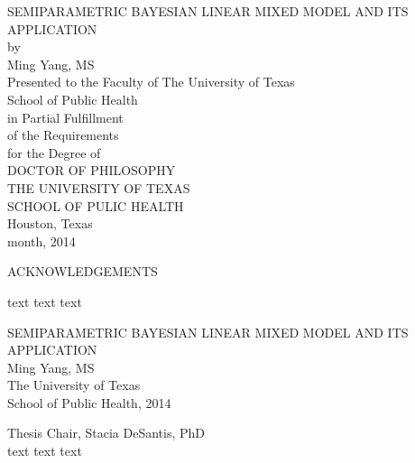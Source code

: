 \documentclass[12pt]{article}
\begin{document}
\newpage
\thispagestyle{empty}
\doublespacing
\begin{center}
{\normalsize SEMIPARAMETRIC BAYESIAN LINEAR MIXED MODEL AND ITS APPLICATION}\\[3.2cm]

by\\[0.5cm]

Ming Yang, MS\\[3.2cm]

Presented to the Faculty of The University of Texas\\
School of Public Health\\
in Partial Fulfillment\\
of the Requirements\\
for the Degree of\\[1.5cm]
DOCTOR OF PHILOSOPHY\\[1.5cm]
\singlespacing
THE UNIVERSITY OF TEXAS\\
SCHOOL OF PULIC HEALTH\\
Houston, Texas\\
month, 2014
\end{center}


\newpage
\thispagestyle{empty}
\doublespacing
\begin{center}
ACKNOWLEDGEMENTS
\end{center}
text text text


\newpage
\thispagestyle{empty}
\doublespacing
\begin{center}
{\normalsize SEMIPARAMETRIC BAYESIAN LINEAR MIXED MODEL AND ITS APPLICATION}\\[2.3cm]
\singlespacing
Ming Yang, MS\\
The University of Texas\\
School of Public Health, 2014
\end{center}

\doublespacing
\noindent
Thesis Chair, Stacia DeSantis, PhD\\
\indent
text text text



\newpage
\tableofcontents

\newpage
\listoftables

\newpage
\listoffigures
 

\newpage
\end{document}
